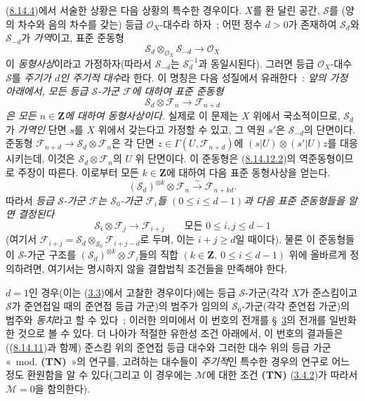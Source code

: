 \begin{remark}[8.14.12]
\label{II.8.14.12-ko}
(\hyperref[II.8.14.4-ko]{8.14.4})에서 서술한 상황은 다음 상황의
특수한 경우이다. $X$를 환 달린 공간, $\mathcal{S}$를 (양의 차수와
음의 차수를 갖는) 등급 $\mathcal{O}_X$-대수라 하자~; 어떤 정수
$d>0$가 존재하여 $\mathcal{S}_d$와 $\mathcal{S}_{-d}$가
\emph{가역}이고, 표준 준동형
\begin{equation}
\label{II.8.14.12.1-ko}
  \mathcal{S}_d\otimes_{\mathcal{O}_X}\mathcal{S}_{-d}
  \to\mathcal{O}_X
\tag{8.14.12.1}
\end{equation}
이 \emph{동형사상}이라고 가정하자(따라서 $\mathcal{S}_{-d}$는
$\mathcal{S}_d^{-1}$과 동일시된다). 그러면 등급
$\mathcal{O}_X$-대수 $\mathcal{S}$를 \emph{주기가 $d$인 주기적 대수}라
한다. 이 명칭은 다음 성질에서 유래한다~: \emph{앞의 가정 아래에서,
모든 등급 $\mathcal{S}$-가군 $\mathcal{F}$에 대하여 표준 준동형}
\begin{equation}
\label{II.8.14.12.2-ko}
  \mathcal{S}_d\otimes\mathcal{F}_n\to\mathcal{F}_{n+d}
\tag{8.14.12.2}
\end{equation}
\emph{은 모든 $n\in\mathbf{Z}$에 대하여 동형사상이다.} 실제로 이 문제는
$X$ 위에서 국소적이므로, $\mathcal{S}_d$가 \emph{가역인} 단면 $s$를
$X$ 위에서 갖는다고 가정할 수 있고, 그 역원 $s'$은
$\mathcal{S}_{-d}$의 단면이다. 준동형
$\mathcal{F}_{n+d}\to\mathcal{S}_d\otimes\mathcal{F}_n$은 각 단면
$z\in\Gamma(U,\mathcal{F}_{n+d})$에
$(s|U)\otimes(s'|U)z$를 대응시키는데, 이것은
$\mathcal{S}_d\otimes\mathcal{F}_n$의 $U$ 위 단면이다. 이 준동형은
(\hyperref[II.8.14.12.2-ko]{8.14.12.2})의 역준동형이므로 주장이
따른다. 이로부터 모든 $k\in\mathbf{Z}$에 대하여 다음 표준 동형사상을
얻는다.
\[
  (\mathcal{S}_d)^{\otimes k}\otimes\mathcal{F}_n
  \xrightarrow{\sim}\mathcal{F}_{n+kd}.
\]
따라서 \emph{등급 $\mathcal{S}$-가군 $\mathcal{F}$는
$\mathcal{S}_0$-가군 $\mathcal{F}_i$들
$(0\leqslant i\leqslant d-1)$과 다음 표준 준동형들을 알면 결정된다}
\[
  \mathcal{S}_i\otimes\mathcal{F}_j\to\mathcal{F}_{i+j}
  \qquad\text{모든 }0\leqslant i,j\leqslant d-1
\]
(여기서
$\mathcal{F}_{i+j}=\mathcal{S}_d\otimes_{\mathcal{S}_0}
\mathcal{F}_{i+j-d}$로 두며, 이는 $i+j\geqslant d$일 때이다). 물론 이
준동형들이 $\mathcal{S}$-가군 구조를
$(\mathcal{S}_d)^{\otimes k}\otimes\mathcal{F}_i$들의 직합
$(k\in\mathbf{Z},\ 0\leqslant i\leqslant d-1)$ 위에 올바르게 정의하려면,
여기서는 명시하지 않을 결합법칙 조건들을 만족해야 한다.

$d=1$인 경우(이는
(\hyperref[subsection:II.3.3-ko]{3.3})에서 고찰한 경우이다)에는 등급
$\mathcal{S}$-가군(각각 $X$가 준스킴이고 $\mathcal{S}$가 준연접일 때의
준연접 등급 가군)의 범주가 임의의 $\mathcal{S}_0$-가군(각각 준연접
가군)의 범주와 \emph{동치}라고 할 수 있다~; 이러한 의미에서 이 번호의
전개를 \S~\hyperref[section:II.3-ko]{3}의 전개를 일반화한 것으로 볼 수
있다. 더 나아가 적절한 유한성 조건 아래에서, 이 번호의 결과들은
((\hyperref[II.8.14.11-ko]{8.14.11})과 함께) 준스킴 위의 준연접 등급
대수와 그러한 대수 위의 등급 가군 «~mod. \textbf{(TN)}~»의 연구를,
고려하는 대수들이 \emph{주기적}인 특수한 경우의 연구로 어느 정도
환원함을 알 수 있다(그리고 이 경우에는 $\mathcal{M}$에 대한 조건
\textbf{(TN)} (\hyperref[II.3.4.2-ko]{3.4.2})가 따라서
$\mathcal{M}=0$을 함의한다).
\end{remark}

